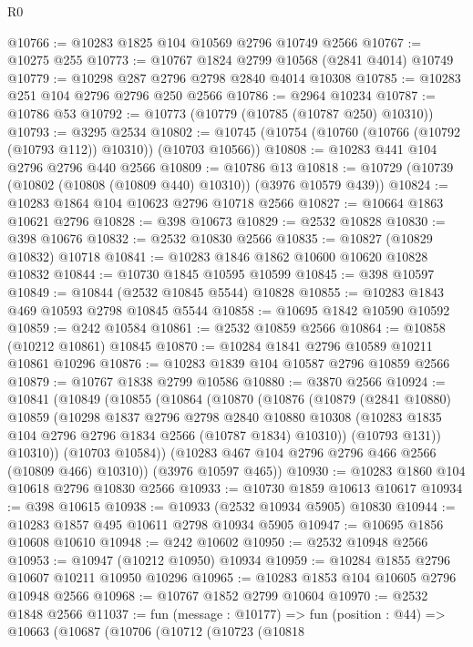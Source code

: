 \begin{lexlean}{R0}
\begin{coremodule}
@10766 := @10283 @1825 @104 @10569 @2796 @10749 @2566
@10767 := @10275 @255
@10773 := @10767 @1824 @2799 @10568 (@2841 @4014) @10749
@10779 := @10298 @287 @2796 @2798 @2840 @4014 @10308
@10785 := @10283 @251 @104 @2796 @2796 @250 @2566
@10786 := @2964 @10234
@10787 := @10786 @53
@10792 := @10773 (@10779 (@10785 (@10787 @250) @10310))
@10793 := @3295 @2534
@10802 := @10745 (@10754 (@10760 (@10766 (@10792 (@10793 @112)) @10310)) (@10703 @10566))
@10808 := @10283 @441 @104 @2796 @2796 @440 @2566
@10809 := @10786 @13
@10818 := @10729 (@10739 (@10802 (@10808 (@10809 @440) @10310)) (@3976 @10579 @439))
@10824 := @10283 @1864 @104 @10623 @2796 @10718 @2566
@10827 := @10664 @1863 @10621 @2796
@10828 := @398 @10673
@10829 := @2532 @10828
@10830 := @398 @10676
@10832 := @2532 @10830 @2566
@10835 := @10827 (@10829 @10832) @10718
@10841 := @10283 @1846 @1862 @10600 @10620 @10828 @10832
@10844 := @10730 @1845 @10595 @10599
@10845 := @398 @10597
@10849 := @10844 (@2532 @10845 @5544) @10828
@10855 := @10283 @1843 @469 @10593 @2798 @10845 @5544
@10858 := @10695 @1842 @10590 @10592
@10859 := @242 @10584
@10861 := @2532 @10859 @2566
@10864 := @10858 (@10212 @10861) @10845
@10870 := @10284 @1841 @2796 @10589 @10211 @10861 @10296
@10876 := @10283 @1839 @104 @10587 @2796 @10859 @2566
@10879 := @10767 @1838 @2799 @10586
@10880 := @3870 @2566
@10924 := @10841
    (@10849
      (@10855
        (@10864
          (@10870
            (@10876
              (@10879
                (@2841 @10880)
                @10859
                (@10298
                  @1837
                  @2796
                  @2798
                  @2840
                  @10880
                  @10308
                  (@10283 @1835 @104 @2796 @2796 @1834 @2566 (@10787 @1834) @10310))
                (@10793 @131))
              @10310))
          (@10703 @10584))
        (@10283 @467 @104 @2796 @2796 @466 @2566 (@10809 @466) @10310))
      (@3976 @10597 @465))
@10930 := @10283 @1860 @104 @10618 @2796 @10830 @2566
@10933 := @10730 @1859 @10613 @10617
@10934 := @398 @10615
@10938 := @10933 (@2532 @10934 @5905) @10830
@10944 := @10283 @1857 @495 @10611 @2798 @10934 @5905
@10947 := @10695 @1856 @10608 @10610
@10948 := @242 @10602
@10950 := @2532 @10948 @2566
@10953 := @10947 (@10212 @10950) @10934
@10959 := @10284 @1855 @2796 @10607 @10211 @10950 @10296
@10965 := @10283 @1853 @104 @10605 @2796 @10948 @2566
@10968 := @10767 @1852 @2799 @10604
@10970 := @2532 @1848 @2566
@11037 := fun (message : @10177) =>
  fun (position : @44) =>
  @10663
    (@10687
      (@10706
        (@10712
          (@10723
            (@10818

\end{coremodule}
\end{lexlean}
